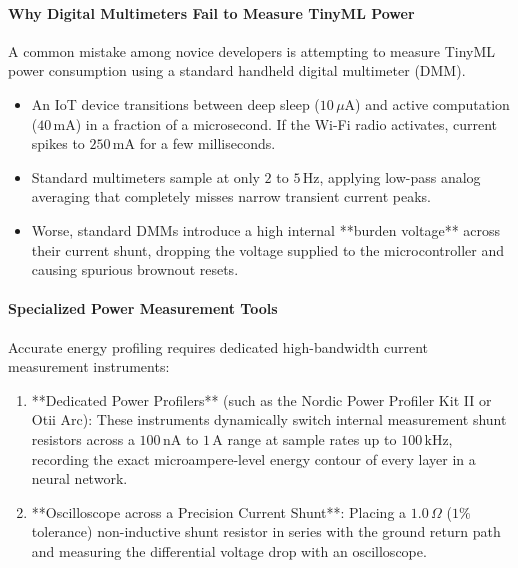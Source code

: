 \paragraph{Why Digital Multimeters Fail to Measure TinyML Power}
A common mistake among novice developers is attempting to measure TinyML power consumption using a standard handheld digital multimeter (DMM). 
\begin{itemize}
    \item An IoT device transitions between deep sleep ($10\,\mu\text{A}$) and active computation ($40\,\text{mA}$) in a fraction of a microsecond. If the Wi-Fi radio activates, current spikes to $250\,\text{mA}$ for a few milliseconds.
    \item Standard multimeters sample at only $2$ to $5\,\text{Hz}$, applying low-pass analog averaging that completely misses narrow transient current peaks.
    \item Worse, standard DMMs introduce a high internal **burden voltage** across their current shunt, dropping the voltage supplied to the microcontroller and causing spurious brownout resets.
\end{itemize}

\paragraph{Specialized Power Measurement Tools}
Accurate energy profiling requires dedicated high-bandwidth current measurement instruments:
\begin{enumerate}
    \item **Dedicated Power Profilers** (such as the Nordic Power Profiler Kit II or Otii Arc): These instruments dynamically switch internal measurement shunt resistors across a $100\,\text{nA}$ to $1\,\text{A}$ range at sample rates up to $100\,\text{kHz}$, recording the exact microampere-level energy contour of every layer in a neural network.
    \item **Oscilloscope across a Precision Current Shunt**: Placing a $1.0\,\Omega$ ($1\%$ tolerance) non-inductive shunt resistor in series with the ground return path and measuring the differential voltage drop with an oscilloscope.
\end{enumerate}

